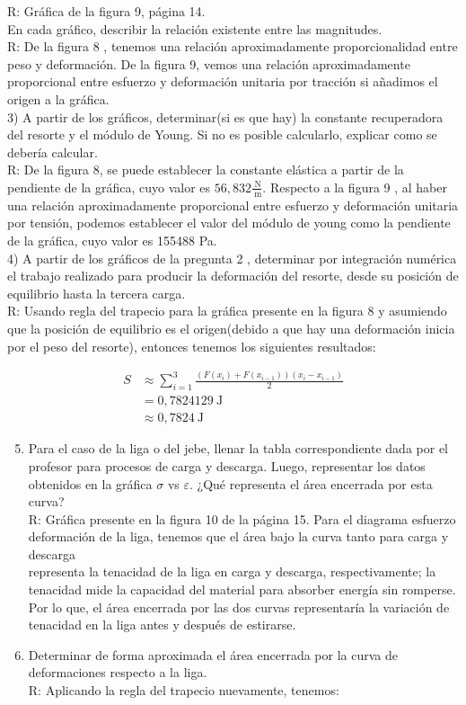 \documentclass[10pt]{article}
\begin{document}
R: Gráfica de la figura 9, página 14.\\
En cada gráfico, describir la relación existente entre las magnitudes.\\
R: De la figura 8 , tenemos una relación aproximadamente proporcionalidad entre peso y deformación. De la figura 9, vemos una relación aproximadamente proporcional entre esfuerzo y deformación unitaria por tracción si añadimos el origen a la gráfica.\\
3) A partir de los gráficos, determinar(si es que hay) la constante recuperadora del resorte y el módulo de Young. Si no es posible calcularlo, explicar como se debería calcular.\\
R: De la figura 8, se puede establecer la constante elástica a partir de la pendiente de la gráfica, cuyo valor es $56,832 \frac{\mathrm{~N}}{\mathrm{~m}}$. Respecto a la figura 9 , al haber una relación aproximadamente proporcional entre esfuerzo y deformación unitaria por tensión, podemos establecer el valor del módulo de young como la pendiente de la gráfica, cuyo valor es 155488 Pa.\\
4) A partir de los gráficos de la pregunta 2 , determinar por integración numérica el trabajo realizado para producir la deformación del resorte, desde su posición de equilibrio hasta la tercera carga.\\
R: Usando regla del trapecio para la gráfica presente en la figura 8 y asumiendo que la posición de equilibrio es el origen(debido a que hay una deformación inicia por el peso del resorte), entonces tenemos los siguientes resultados:

$$
\begin{aligned}
S & \approx \sum_{i=1}^{3} \frac{\left(F\left(x_{i}\right)+F\left(x_{i-1}\right)\right)\left(x_{i}-x_{i-1}\right)}{2} \\
& =0,7824129 \mathrm{~J} \\
& \approx 0,7824 \mathrm{~J}
\end{aligned}
$$

\begin{enumerate}
  \setcounter{enumi}{4}
  \item Para el caso de la liga o del jebe, llenar la tabla correspondiente dada por el profesor para procesos de carga y descarga. Luego, representar los datos obtenidos en la gráfica $\sigma$ vs $\varepsilon$. ¿Qué representa el área encerrada por esta curva?\\
R: Gráfica presente en la figura 10 de la página 15. Para el diagrama esfuerzo deformación de la liga, tenemos que el área bajo la curva tanto para carga y descarga\\
representa la tenacidad de la liga en carga y descarga, respectivamente; la tenacidad mide la capacidad del material para absorber energía sin romperse. Por lo que, el área encerrada por las dos curvas representaría la variación de tenacidad en la liga antes y después de estirarse.
  \item Determinar de forma aproximada el área encerrada por la curva de deformaciones respecto a la liga.\\
R: Aplicando la regla del trapecio nuevamente, tenemos:
\end{enumerate}
\end{document}

